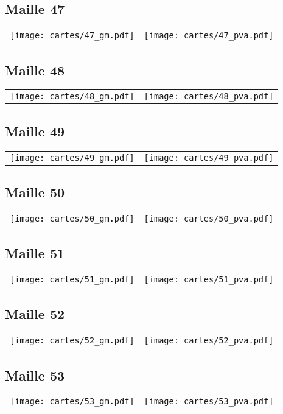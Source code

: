 \subsection{Maille 47}
\begin{tabular}{ll}
\texttt{[image: cartes/47\_gm.pdf]}
&
\texttt{[image: cartes/47\_pva.pdf]}
\end{tabular}
\newpage
\subsection{Maille 48}
\begin{tabular}{ll}
\texttt{[image: cartes/48\_gm.pdf]}
&
\texttt{[image: cartes/48\_pva.pdf]}
\end{tabular}
\newpage
\subsection{Maille 49}
\begin{tabular}{ll}
\texttt{[image: cartes/49\_gm.pdf]}
&
\texttt{[image: cartes/49\_pva.pdf]}
\end{tabular}
\newpage
\subsection{Maille 50}
\begin{tabular}{ll}
\texttt{[image: cartes/50\_gm.pdf]}
&
\texttt{[image: cartes/50\_pva.pdf]}
\end{tabular}
\newpage
\subsection{Maille 51}
\begin{tabular}{ll}
\texttt{[image: cartes/51\_gm.pdf]}
&
\texttt{[image: cartes/51\_pva.pdf]}
\end{tabular}
\newpage
\subsection{Maille 52}
\begin{tabular}{ll}
\texttt{[image: cartes/52\_gm.pdf]}
&
\texttt{[image: cartes/52\_pva.pdf]}
\end{tabular}
\newpage
\subsection{Maille 53}
\begin{tabular}{ll}
\texttt{[image: cartes/53\_gm.pdf]}
&
\texttt{[image: cartes/53\_pva.pdf]}
\end{tabular}
\newpage
